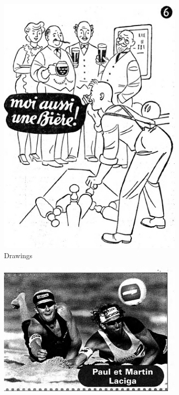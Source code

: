 \begin{figure}[ht]
\begin{minipage}[5cm]{0.3\textwidth}
        \begin{subfigure}{3.5cm}
            \includegraphics[width=\linewidth]{Images/logo FPs/drawings/IMP-1955-01-31-a-i0053.jpg}
            \caption{Drawings}
        \end{subfigure}
    \end{minipage}%
    \hfill
    \begin{minipage}[5cm]{0.3\textwidth}
        \centering
        \begin{subfigure}{3cm}
            \includegraphics[width=\linewidth]{Images/logo FPs/photos/EXP-2000-09-13-a-i0271.jpg}
            

\end{subfigure}
\end{minipage}
\end{figure}

